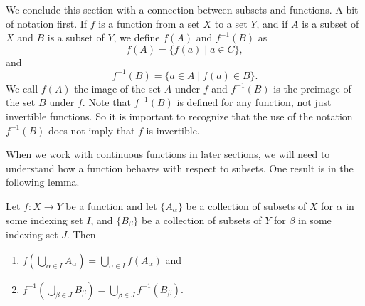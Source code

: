 \label{sec_fun_set}

We conclude this section with a connection between subsets and functions. A bit of notation first. If $f$ is a function from a set $X$ to a set $Y$, and if $A$ is a subset of $X$ and $B$ is a subset of $Y$, we define $f(A)$ and $f^{-1}(B)$ as 
\[f(A) = \{f(a) \mid a \in C\},\]
and 
\[f^{-1}(B) = \{a \in A \mid f(a) \in B\}.\]
We call $f(A)$ the image of the set $A$ under $f$ and $f^{-1}(B)$ is the preimage of the set $B$ under $f$. Note that $f^{-1}(B)$ is defined for any function, not just invertible functions. So it is important to recognize that the use of the notation $f^{-1}(B)$ does not imply that $f$ is invertible. 

When we work with continuous functions in later sections, we will need to understand how a function behaves with respect to subsets. One result is in the following lemma. 

\begin{lemma} \label{lem:functions_subsets} Let $f : X \to Y$ be a function and let $\{A_{\alpha}\}$ be a collection of subsets of $X$ for $\alpha$ in some indexing set $I$, and $\{B_{\beta}\}$ be a collection of subsets of $Y$ for $\beta$ in some indexing set $J$. Then
\begin{enumerate}
\item $f\left(\bigcup_{\alpha \in I} A_{\alpha}\right) = \bigcup_{\alpha \in I} f(A_{\alpha})$ and
\item $f^{-1}\left(\bigcup_{\beta \in J} B_{\beta}\right) = \bigcup_{\beta \in J} f^{-1}(B_{\beta})$.
\end{enumerate}
\end{lemma}

